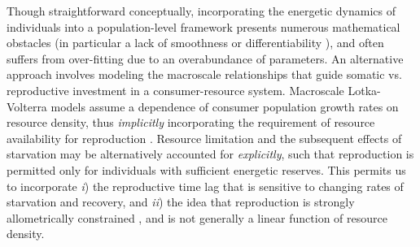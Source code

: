 \documentclass{pnastwo}
\begin{document}
\begin{article}
Though straightforward conceptually, incorporating the energetic dynamics of individuals \cite{Kooi2000} into a population-level framework \cite{Kooi2000,Sousa:2010ez} presents numerous mathematical obstacles (in particular a lack of smoothness or differentiability \cite{Diekmann:2010da}), and often suffers from over-fitting due to an overabundance of parameters.
An alternative approach involves modeling the macroscale relationships that guide somatic vs. reproductive investment in a consumer-resource system. %
Macroscale Lotka-Volterra models assume a dependence of consumer population growth rates on resource density, thus \emph{implicitly} incorporating the requirement of resource availability for reproduction \cite{murdoch:2003}.
Resource limitation and the subsequent effects of starvation may be alternatively accounted for \emph{explicitly}, such that reproduction is permitted only for individuals with sufficient energetic reserves.
This permits us to incorporate 
\emph{i}) the reproductive time lag that is sensitive to changing rates of starvation and recovery, and 
\emph{ii}) the idea that reproduction is strongly allometrically constrained \cite{Kempes:2012hy}, and is not generally a linear function of resource density.





\end{article}
\end{document}
